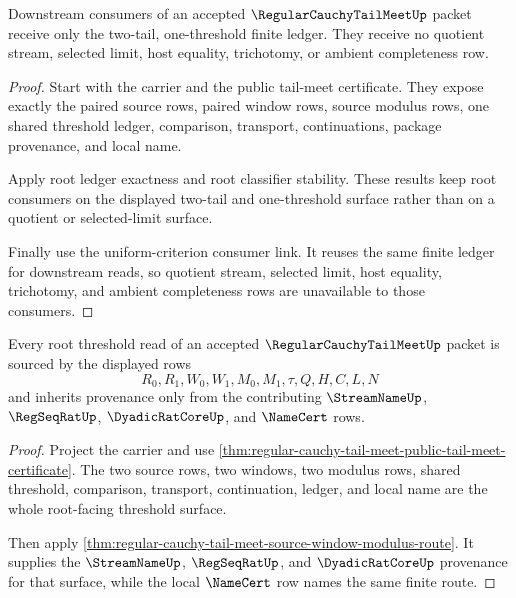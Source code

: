 \begin{theorem}
\label{thm:regular-cauchy-tail-meet-root-consumer-exhaustion}
Downstream consumers of an accepted $\RegularCauchyTailMeetUp$ packet receive only the two-tail, one-threshold finite ledger. They receive no quotient stream, selected limit, host equality, trichotomy, or ambient completeness row.
\end{theorem}
\begin{proof}
Start with the carrier and the public tail-meet certificate. They expose exactly the paired source rows, paired window rows, source modulus rows, one shared threshold ledger, comparison, transport, continuations, package provenance, and local name.

Apply root ledger exactness and root classifier stability. These results keep root consumers on the displayed two-tail and one-threshold surface rather than on a quotient or selected-limit surface.

Finally use the uniform-criterion consumer link. It reuses the same finite ledger for downstream reads, so quotient stream, selected limit, host equality, trichotomy, and ambient completeness rows are unavailable to those consumers.
\end{proof}

\begin{theorem}
\label{thm:regular-cauchy-tail-meet-root-threshold-provenance}
Every root threshold read of an accepted $\RegularCauchyTailMeetUp$ packet is sourced by the displayed rows
$$
R_0,R_1,W_0,W_1,M_0,M_1,\tau,Q,H,C,L,N
$$
and inherits provenance only from the contributing $\StreamNameUp$, $\RegSeqRatUp$, $\DyadicRatCoreUp$, and $\NameCert$ rows.
\end{theorem}
\begin{proof}
Project the carrier and use \autoref{thm:regular-cauchy-tail-meet-public-tail-meet-certificate}. The two source rows, two windows, two modulus rows, shared threshold, comparison, transport, continuation, ledger, and local name are the whole root-facing threshold surface.

Then apply \autoref{thm:regular-cauchy-tail-meet-source-window-modulus-route}. It supplies the $\StreamNameUp$, $\RegSeqRatUp$, and $\DyadicRatCoreUp$ provenance for that surface, while the local $\NameCert$ row names the same finite route.
\end{proof}

